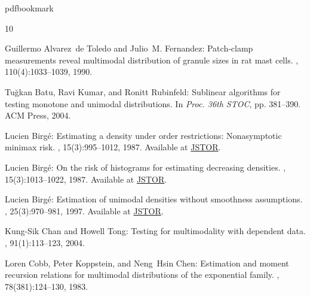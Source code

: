 %
%
%
%
%
\providecommand{\bibhead}[1]{}
%
\expandafter\ifx\csname pdfbookmark\endcsname\relax%
  \providecommand{\tocrefpdfbookmark}{}
\else\providecommand{\tocrefpdfbookmark}{%
   \hypertarget{tocreferences}{}%
   \pdfbookmark[1]{References}{tocreferences}}%
\fi

\tocrefpdfbookmark
\begin{thebibliography}{10}

\bibhead{ToledoFernandez:90}
{\sc Guillermo Alvarez~de Toledo and Julio~M. Fernandez}: Patch-clamp
  measurements reveal multimodal distribution of granule sizes in rat mast
  cells.
, 110(4):1033--1039, 1990.

\bibhead{BKR:04long}
{\sc Tu{\u g}kan Batu, Ravi Kumar, and Ronitt Rubinfeld}: Sublinear algorithms
  for testing monotone and unimodal distributions.
\newblock In {\em Proc. 36th STOC}, pp. 381--390. ACM Press, 2004.
\newblock [\epfmtdoi{10.1145/1007352.1007414}]

\bibhead{Birge:87}
{\sc Lucien Birg{\'e}}: Estimating a density under order restrictions:
  {N}onasymptotic minimax risk.
, 15(3):995--1012, 1987.
\newblock Available at \href{http://www.jstor.org/stable/2241811}{JSTOR}.

\bibhead{Birge:87b}
{\sc Lucien Birg{\'e}}: {On the risk of histograms for estimating decreasing
  densities}.
, 15(3):1013--1022, 1987.
\newblock Available at \href{http://www.jstor.org/stable/2241812}{JSTOR}.

\bibhead{Birge:97}
{\sc Lucien Birg{\'e}}: Estimation of unimodal densities without smoothness
  assumptions.
, 25(3):970--981, 1997.
\newblock Available at \href{http://www.jstor.org/stable/2242507}{JSTOR}.

\bibhead{ChanTong:04}
{\sc Kung-Sik Chan and Howell Tong}: Testing for multimodality with dependent
  data.
, 91(1):113--123, 2004.

\bibhead{CKC:83}
{\sc Loren Cobb, Peter Koppstein, and Neng~Hsin Chen}: Estimation and moment
  recursion relations for multimodal distributions of the exponential family.
, 78(381):124--130, 1983.
\newblock [\epfmtdoi{10.1080/01621459.1983.10477940}]


\end{thebibliography}
